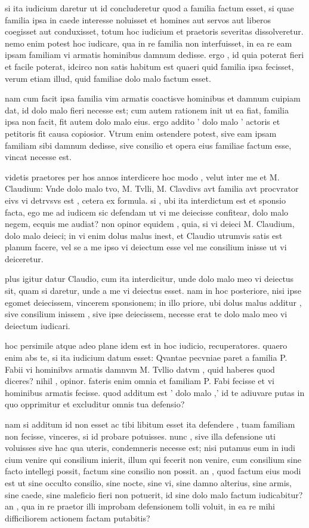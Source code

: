  si ita iudicium daretur ut id concluderetur quod a familia factum esset, si quae familia ipsa in caede interesse noluisset et homines aut servos aut liberos coegisset aut conduxisset, totum hoc iudicium et praetoris severitas dissolveretur. nemo enim potest hoc iudicare, qua in re familia non interfuisset, in ea re eam ipsam familiam vi armatis hominibus damnum dedisse. ergo , id quia poterat fieri et facile poterat, idcirco non satis habitum est quaeri quid familia ipsa fecisset, verum etiam illud, quid familiae dolo malo factum esset.

 nam cum facit ipsa familia vim armatis coactisve hominibus et damnum cuipiam dat, id dolo malo fieri necesse est; cum autem rationem init ut ea fiat, familia ipsa non facit, fit autem dolo malo eius. ergo addito ' dolo malo ' actoris et petitoris fit causa copiosior. Vtrum enim ostendere potest, sive eam ipsam familiam sibi damnum dedisse, sive consilio et opera eius familiae factum esse, vincat necesse est.

 videtis praetores per hos annos interdicere hoc modo , velut inter me et M. Claudium: Vnde dolo malo tvo, M. Tvlli, M. Clavdivs avt familia avt procvrator eivs vi detrvsvs est , cetera ex formula. si , ubi ita interdictum est et sponsio facta, ego me ad iudicem sic defendam ut vi me deiecisse confitear, dolo malo negem, ecquis me audiat? non opinor equidem , quia, si vi deieci M. Claudium, dolo malo deieci; in vi enim dolus malus inest, et Claudio utrumvis satis est planum facere, vel se a me ipso vi deiectum esse vel me consilium inisse ut vi deiceretur.

 plus igitur datur Claudio, cum ita interdicitur, unde dolo malo meo vi deiectus sit, quam si daretur, unde a me vi deiectus esset. nam in hoc posteriore, nisi ipse egomet deiecissem, vincerem sponsionem; in illo priore, ubi dolus malus additur , sive consilium inissem , sive ipse deiecissem, necesse erat te dolo malo meo vi deiectum iudicari.

 hoc persimile atque adeo plane idem est in hoc iudicio, recuperatores. quaero enim abs te, si ita iudicium datum esset: Qvantae pecvniae paret a familia P. Fabii vi hominibvs armatis damnvm M. Tvllio datvm , quid haberes quod diceres? nihil , opinor. fateris enim omnia et familiam P. Fabi fecisse et vi hominibus armatis fecisse. quod additum est ' dolo malo ,' id te adiuvare putas in quo opprimitur et excluditur omnis tua defensio?

 nam si additum id non esset ac tibi libitum esset ita defendere , tuam familiam non fecisse, vinceres, si id probare potuisses. nunc , sive illa defensione uti voluisses sive hac qua uteris, condemneris necesse est; nisi putamus eum in iudi cium venire qui consilium inierit, illum qui fecerit non venire, cum consilium sine facto intellegi possit, factum sine consilio non possit. an , quod factum eius modi est ut sine occulto consilio, sine nocte, sine vi, sine damno alterius, sine armis, sine caede, sine maleficio fieri non potuerit, id sine dolo malo factum iudicabitur? an , qua in re praetor illi improbam defensionem tolli voluit, in ea re mihi difficiliorem actionem factam putabitis?

